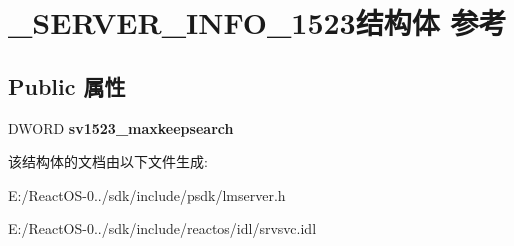 \hypertarget{struct___s_e_r_v_e_r___i_n_f_o__1523}{}\section{\+\_\+\+S\+E\+R\+V\+E\+R\+\_\+\+I\+N\+F\+O\+\_\+1523结构体 参考}
\label{struct___s_e_r_v_e_r___i_n_f_o__1523}
\subsection*{Public 属性}
\begin{DoxyCompactItemize}
\item 
\mbox{\label{struct___s_e_r_v_e_r___i_n_f_o__1523_aa53503fe43e8e19e2c225b0339930c37}} 
D\+W\+O\+RD {\bfseries sv1523\+\_\+maxkeepsearch}
\end{DoxyCompactItemize}


该结构体的文档由以下文件生成\+:\begin{DoxyCompactItemize}
\item 
E\+:/\+React\+O\+S-\/0../sdk/include/psdk/lmserver.\+h\item 
E\+:/\+React\+O\+S-\/0../sdk/include/reactos/idl/srvsvc.\+idl\end{DoxyCompactItemize}
